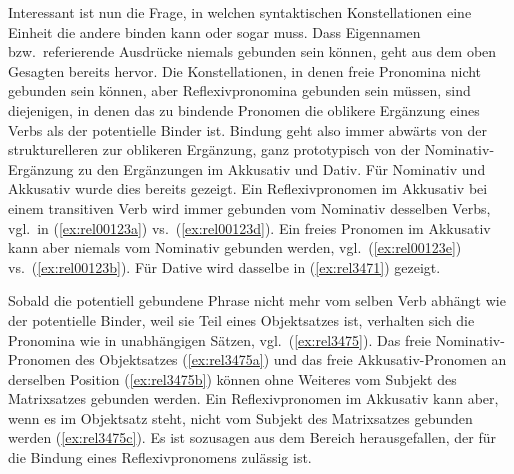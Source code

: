 
Interessant ist nun die Frage, in welchen syntaktischen Konstellationen eine Einheit die andere binden kann oder sogar muss.
Dass Eigennamen bzw.\ referierende Ausdrücke niemals gebunden sein können, geht aus dem oben Gesagten bereits hervor.
Die Konstellationen, in denen freie Pronomina nicht gebunden sein können, aber Reflexivpronomina gebunden sein müssen, sind diejenigen, in denen das zu bindende Pronomen die oblikere Ergänzung eines Verbs als der potentielle Binder ist.
Bindung geht also immer abwärts von der strukturelleren zur oblikeren Ergänzung, ganz prototypisch von der Nominativ-Ergänzung zu den Ergänzungen im Akkusativ und Dativ.
Für Nominativ und Akkusativ wurde dies bereits gezeigt.
Ein Reflexivpronomen im Akkusativ bei einem transitiven Verb wird immer gebunden vom Nominativ desselben Verbs, vgl.\ in (\ref{ex:rel00123a}) vs.\ (\ref{ex:rel00123d}).
Ein freies Pronomen im Akkusativ kann aber niemals vom Nominativ gebunden werden, vgl.\ (\ref{ex:rel00123e}) vs.\ (\ref{ex:rel00123b}).
Für Dative wird dasselbe in (\ref{ex:rel3471}) gezeigt.

\begin{exe}
  \ex\label{ex:rel3471}
  \begin{xlist}
  \end{xlist}
\end{exe}

Sobald die potentiell gebundene Phrase nicht mehr vom selben Verb abhängt wie der potentielle Binder, weil sie \zB Teil eines Objektsatzes ist, verhalten sich die Pronomina wie in unabhängigen Sätzen, vgl.\ (\ref{ex:rel3475}).
Das freie Nominativ-Pronomen des Objektsatzes (\ref{ex:rel3475a}) und das freie Akkusativ-Pronomen an derselben Position (\ref{ex:rel3475b}) können ohne Weiteres vom Subjekt des Matrixsatzes gebunden werden.
Ein Reflexivpronomen im Akkusativ kann aber, wenn es im Objektsatz steht, nicht vom Subjekt des Matrixsatzes gebunden werden (\ref{ex:rel3475c}).
Es ist sozusagen aus dem Bereich herausgefallen, der für die Bindung eines Reflexivpronomens zulässig ist.

\begin{exe}
  \ex\label{ex:rel3475}
  \begin{xlist}
  \end{xlist}
\end{exe}

